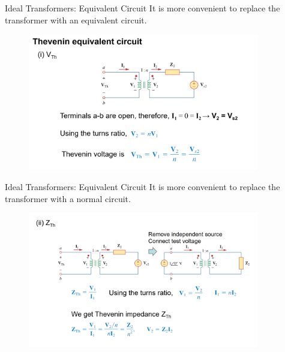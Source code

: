 \documentclass{beamer}
\begin{document}
\begin{frame}{Ideal Transformers: Equivalent Circuit}
It is more convenient to replace the transformer with an equivalent circuit.

\begin{figure}[H]
        \centering
        \includegraphics[width=0.9\textwidth]{C13/9.png}
    \end{figure}
\end{frame}

\begin{frame}{Ideal Transformers: Equivalent Circuit}
It is more convenient to replace the transformer with a normal circuit.

\begin{figure}[H]
        \centering
        \includegraphics[width=0.9\textwidth]{C13/10.png}
    \end{figure}
\end{frame}
\end{document}
